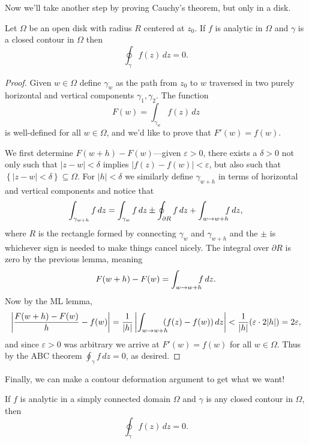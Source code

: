 \documentclass[../m136main.tex]{subfiles}
\begin{document}
Now we'll take another step by proving Cauchy's theorem, but only in a disk.

\begin{lemma}
    Let $\Omega$ be an open disk with radius $R$ centered at $z_0$.
    If $f$ is analytic in $\Omega$ and $\gamma$ is a closed contour in $\Omega$ then
    \[ \oint_\gamma f(z) \,dz = 0. \]
\end{lemma}

\begin{proof}
    Given $w \in \Omega$ define $\gamma_w$ as the path from $z_0$ to $w$ traversed in two purely horizontal and vertical components $\gamma_1, \gamma_2$.
    The function
    \[ F(w) = \int_{\gamma_w} f(z) \,dz \]
    is well-defined for all $w \in \Omega$, and we'd like to prove that $F'(w) = f(w)$.

    We first determine $F(w+h) - F(w)$---given $\varepsilon > 0$, there exists a $\delta > 0$ not only such that $|z-w| < \delta$ implies $|f(z) - f(w)| < \varepsilon$, but also such that $\left\{ |z-w| < \delta \right\} \subseteq \Omega$.
    For $|h| < \delta$ we similarly define $\gamma_{w+h}$ in terms of horizontal and vertical components and notice that
    \[ \int_{\gamma_{w+h}} f \,dz = \int_{\gamma_w} f \,dz \pm \oint_{\partial R} f \,dz + \int_{w \to w+h} \hspace{-6pt} f \,dz, \]
    where $R$ is the rectangle formed by connecting $\gamma_w$ and $\gamma_{w+h}$ and the $\pm$ is whichever sign is needed to make things cancel nicely.
    The integral over $\partial R$ is zero by the previous lemma, meaning
    \[ F(w+h) - F(w) = \int_{w \to w+h} \hspace{-6pt} f \,dz. \]
    Now by the ML lemma,
    \[ \left| \frac{F(w+h) - F(w)}{h} - f(w) \right| = \frac{1}{|h|} \left| \int_{w \to w+h} \hspace{-6pt} (f(z) - f(w)) \,dz \right| < \frac{1}{|h|} (\varepsilon \cdot 2|h|) = 2\varepsilon, \]
    and since $\varepsilon > 0$ was arbitrary we arrive at $F'(w) = f(w)$ for all $w \in \Omega$.
    Thus by the ABC theorem $\oint_\gamma f \,dz = 0$, as desired.
\end{proof}

Finally, we can make a contour deformation argument to get what we want!

\pagebreak

\begin{theorem}
    If $f$ is analytic in a simply connected domain $\Omega$ and $\gamma$ is any closed contour in $\Omega$, then
    \[ \oint_\gamma f(z) \,dz = 0. \]
\end{theorem}
\end{document}
